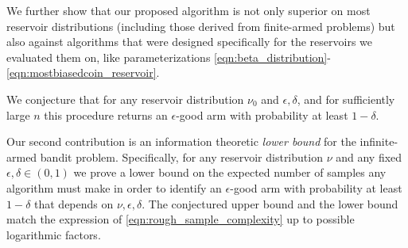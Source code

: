 We further show that our proposed algorithm is not only superior on most reservoir distributions (including those derived from finite-armed problems) but also against algorithms that were designed specifically for the reservoirs we evaluated them on, like parameterizations \eqref{eqn:beta_distribution}-\eqref{eqn:mostbiasedcoin_reservoir}.

We conjecture that for any reservoir distribution $\nu_0$ and $\epsilon,\delta$, and for sufficiently large $n$ this procedure returns an $\epsilon$-good arm with probability at least $1-\delta$.

Our second contribution is an information theoretic \emph{lower bound} for the infinite-armed bandit problem. 
Specifically, for any reservoir distribution $\nu$ and any fixed $\epsilon,\delta \in (0,1)$ we prove a lower bound on the expected number of samples any algorithm must make in order to identify an $\epsilon$-good arm with probability at least $1-\delta$ that depends on $\nu,\epsilon,\delta$. 
The conjectured upper bound and the lower bound match the expression of \eqref{eqn:rough_sample_complexity} up to possible logarithmic factors.  


